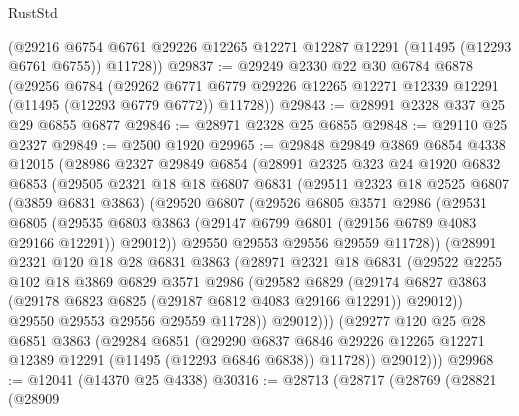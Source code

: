 \begin{lexlean}{RustStd}
\begin{coremodule}
      (@29216 @6754 @6761 @29226 @12265 @12271 @12287 @12291 (@11495 (@12293 @6761 @6755)) @11728))
@29837 := @29249
    @2330
    @22
    @30
    @6784
    @6878
    (@29256
      @6784
      (@29262 @6771 @6779 @29226 @12265 @12271 @12339 @12291 (@11495 (@12293 @6779 @6772)) @11728))
@29843 := @28991 @2328 @337 @25 @29 @6855 @6877
@29846 := @28971 @2328 @25 @6855
@29848 := @29110 @25 @2327
@29849 := @2500 @1920
@29965 := @29848
    @29849
    @3869
    @6854
    @4338
    @12015
    (@28986
      @2327
      @29849
      @6854
      (@28991
        @2325
        @323
        @24
        @1920
        @6832
        @6853
        (@29505
          @2321
          @18
          @18
          @6807
          @6831
          (@29511
            @2323
            @18
            @2525
            @6807
            (@3859 @6831 @3863)
            (@29520
              @6807
              (@29526
                @6805
                @3571
                @2986
                (@29531
                  @6805
                  (@29535
                    @6803
                    @3863
                    (@29147 @6799 @6801 (@29156 @6789 @4083 @29166 @12291))
                    @29012))
                @29550
                @29553
                @29556
                @29559
                @11728))
            (@28991
              @2321
              @120
              @18
              @28
              @6831
              @3863
              (@28971
                @2321
                @18
                @6831
                (@29522
                  @2255
                  @102
                  @18
                  @3869
                  @6829
                  @3571
                  @2986
                  (@29582
                    @6829
                    (@29174
                      @6827
                      @3863
                      (@29178 @6823 @6825 (@29187 @6812 @4083 @29166 @12291))
                      @29012))
                  @29550
                  @29553
                  @29556
                  @29559
                  @11728))
              @29012)))
        (@29277
          @120
          @25
          @28
          @6851
          @3863
          (@29284
            @6851
            (@29290
              @6837
              @6846
              @29226
              @12265
              @12271
              @12389
              @12291
              (@11495 (@12293 @6846 @6838))
              @11728))
          @29012)))
@29968 := @12041 (@14370 @25 @4338)
@30316 := @28713
    (@28717
      (@28769
        (@28821
          (@28909

\end{coremodule}
\end{lexlean}
